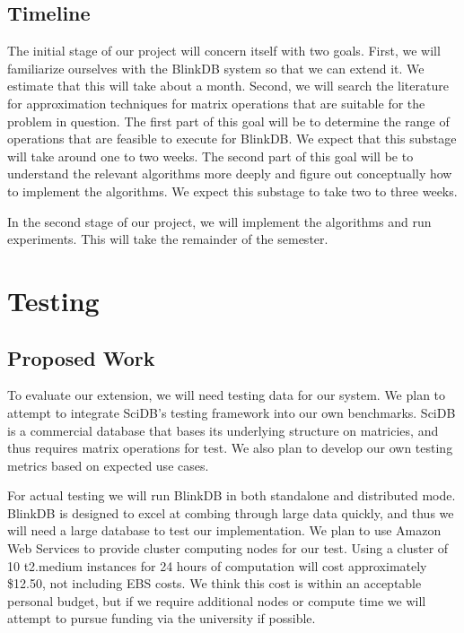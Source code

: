 \documentclass[twoside]{article}
\begin{document}
\begin{multicols}{2}
\subsection{Timeline}

The initial stage of our project will concern itself with two goals. First, we will familiarize ourselves with the BlinkDB system so that we can extend it. We estimate that this will take about a month. Second, we will search the literature for approximation techniques for matrix operations that are suitable for the problem in question. The first part of this goal will be to determine the range of operations that are feasible to execute for BlinkDB. We expect that this substage will take around one to two weeks. The second part of this goal will be to understand the relevant algorithms more deeply and figure out conceptually how to implement the algorithms. We expect this substage to take two to three weeks.

In the second stage of our project, we will implement the algorithms and run experiments. This will take the remainder of the semester. 

\section{Testing}

\subsection{Proposed Work}
To evaluate our extension, we will need testing data for our system. We plan to attempt to integrate SciDB's testing framework into our own benchmarks. SciDB is a commercial database that bases its underlying structure on matricies, and thus requires matrix operations for test. We also plan to develop our own testing metrics based on expected use cases.

For actual testing we will run BlinkDB in both standalone and distributed mode. BlinkDB is designed to excel at combing through large data quickly, and thus we will need a large database to test our implementation. We plan to use Amazon Web Services to provide cluster computing nodes for our test. Using a cluster of 10 
t2.medium instances for 24 hours of computation will cost approximately \$12.50, not including EBS costs. We think this cost is within an acceptable personal budget, but if we require additional nodes or compute time we will attempt to pursue funding via the university if possible.


\end{multicols}
\end{document}
